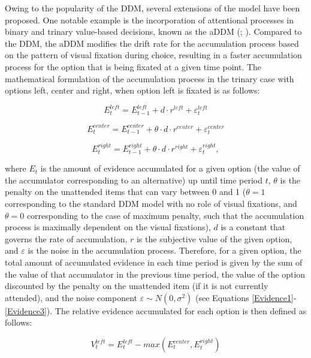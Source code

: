 \documentclass[11pt,a4paper]{article}
\begin{document}
Owing to the popularity of the DDM, several extensions of the model have been proposed. One notable example is the incorporation of attentional processes in binary and trinary value-based decisions, known as the aDDM (; ). Compared to the DDM, the aDDM modifies the drift rate for the accumulation process based on the pattern of visual fixation during choice, resulting in a faster accumulation process for the option that is being fixated at a given time point. The mathematical formulation of the accumulation process in the trinary case with options left, center and right, when option left is fixated is as follows:

\begin{equation} \label{Evidence1}
E_{t}^{left}=E_{t-1}^{left}+d\cdot r^{left}+\varepsilon_{t}^{left}
\end{equation}

\begin{equation} \label{Evidence2}
E_{t}^{center}=E_{t-1}^{center}+\theta\cdot d\cdot r^{center}+\varepsilon_{t}^{center}
\end{equation}


\begin{equation} \label{Evidence3}
E_{t}^{right}=E_{t-1}^{right}+\theta\cdot d\cdot r^{right}+\varepsilon_{t}^{right},
\end{equation}

where $E_{t}$ is the amount of evidence accumulated for a given option
(the value of the accumulator corresponding to an alternative) up
until time period $t$, $\theta$ is the penalty on the unattended
items that can vary between 0 and 1 ($\theta=1$ corresponding to the standard DDM model with no role of visual fixations, and $\theta=0$ corresponding to the case of maximum penalty, such that the accumulation process is maximally dependent on the visual fixations), $d$ is a constant that governs the rate of accumulation,
$r$ is the subjective value of the given option, and $\varepsilon$ is the noise
in the accumulation process. Therefore, for a given option, the total
amount of accumulated evidence in each time period is given by the
sum of the value of that accumulator in the previous time period,
the value of the option discounted by the penalty on the unattended
item (if it is not currently attended), and the noise component $\varepsilon\sim N(0,\sigma^{2})$ (see Equations \ref{Evidence1}-\ref{Evidence3}). The relative evidence accumulated for each option is then defined as follows:

\begin{equation} \label{REA1}
V_{t}^{left}=E_{t}^{left}-max(E_{t}^{center},E_{t}^{right})
\end{equation}
\end{document}
